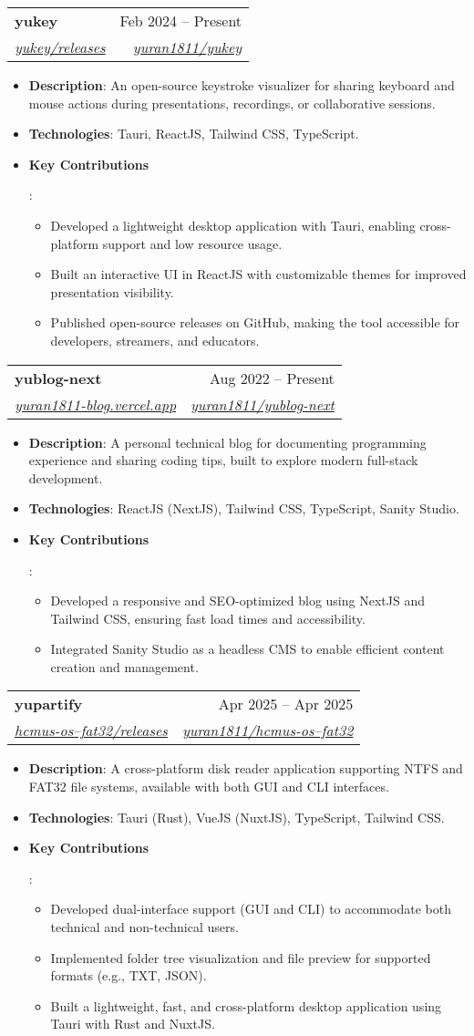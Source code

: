 \documentclass[letterpaper,11pt]{article}
\makeatletter
\newcommand{\resumeSubheading}[4]{\vspace{-1pt}\item
    \begin{tabular*}{0.97\textwidth}[t]{l@{\extracolsep{\fill}}r}
      \textbf{#1} & #2 \\
      \textit{\small#3} & \textit{\small #4} \\
    \end{tabular*}\vspace{-5pt}
}
\newcommand{\resumeItem}[2]{\item\small{\textbf{#1}{: #2\vspace{-2pt}}}}
\newcommand{\resumeItemListStart}{\begin{itemize}[leftmargin=*]}
\newcommand{\resumeItemListEnd}{\end{itemize}\vspace{-5pt}}
\makeatother
\begin{document}
\resumeSubheading
{yukey}{Feb 2024 -- Present}
{\href{https://github.com/yuran1811/yukey/releases}{yukey/releases}}
{\href{https://github.com/yuran1811/yukey}{yuran1811/yukey}}
\resumeItemListStart
\resumeItem{Description}
{An open-source keystroke visualizer for sharing keyboard and mouse actions during presentations, recordings, or collaborative sessions.}
\resumeItem{Technologies}
{Tauri, ReactJS, Tailwind CSS, TypeScript.}
\resumeItem{Key Contributions}
{\begin{itemize}[leftmargin=*]
    \item Developed a lightweight desktop application with Tauri, enabling cross-platform support and low resource usage.
    \item Built an interactive UI in ReactJS with customizable themes for improved presentation visibility.
    \item Published open-source releases on GitHub, making the tool accessible for developers, streamers, and educators.
\end{itemize}}
\resumeItemListEnd

\resumeSubheading
{yublog-next}{Aug 2022 -- Present}
{\href{https://yuran1811-blog.vercel.app/}{yuran1811-blog.vercel.app}}
{\href{https://github.com/yuran1811/yublog-next}{yuran1811/yublog-next}}
\resumeItemListStart
\resumeItem{Description}
{A personal technical blog for documenting programming experience and sharing coding tips, built to explore modern full-stack development.}
\resumeItem{Technologies}
{ReactJS (NextJS), Tailwind CSS, TypeScript, Sanity Studio.}
\resumeItem{Key Contributions}
{\begin{itemize}[leftmargin=*]
    \item Developed a responsive and SEO-optimized blog using NextJS and Tailwind CSS, ensuring fast load times and accessibility.
    \item Integrated Sanity Studio as a headless CMS to enable efficient content creation and management.
\end{itemize}}
\resumeItemListEnd

\resumeSubheading
{yupartify}{Apr 2025 -- Apr 2025}
{\href{https://github.com/yuran1811/hcmus-os--fat32/releases}{hcmus-os--fat32/releases}}
{\href{https://github.com/yuran1811/hcmus-os--fat32}{yuran1811/hcmus-os--fat32}}
\resumeItemListStart
\resumeItem{Description}
{A cross-platform disk reader application supporting NTFS and FAT32 file systems, available with both GUI and CLI interfaces.}
\resumeItem{Technologies}
{Tauri (Rust), VueJS (NuxtJS), TypeScript, Tailwind CSS.}
\resumeItem{Key Contributions}
{\begin{itemize}[leftmargin=*]
    \item Developed dual-interface support (GUI and CLI) to accommodate both technical and non-technical users.
    \item Implemented folder tree visualization and file preview for supported formats (e.g., TXT, JSON).
    \item Built a lightweight, fast, and cross-platform desktop application using Tauri with Rust and NuxtJS\@.
\end{itemize}}
\resumeItemListEnd
\end{document}
